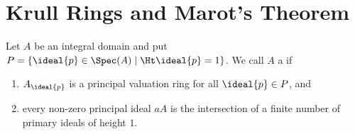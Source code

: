 \documentclass[../main]{subfiles}
\begin{document}
\section{Krull Rings and Marot's Theorem}\label{sec:41}

\newparagraph Let $A$ be an integral domain and put $P=\{\ideal{p} \in \Spec(A) \mid\Ht\ideal{p}=1\}$. We call $A$ a  if
\begin{enumerate}[label = (\arabic*)]
    \item $A_{\ideal{p}}$ is a principal valuation ring for all $\ideal{p} \in P$, and
    \item every non-zero principal ideal $aA$ is the intersection of a finite number of primary ideals of height $1$.
\end{enumerate}
\end{document}
